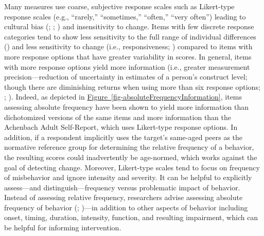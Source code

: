 \documentclass[
  american,
  letterpaper,
  12pt]{article}
\newlength{\apatablekeepdepth}
\newcommand{\apatablekeep}{%
  \par\setlength{\apatablekeepdepth}{\prevdepth}%
  \setbox\apatablekeepbox\vbox\bgroup\prevdepth\apatablekeepdepth}
\begin{document}
Many measures use coarse, subjective response scales such as Likert-type
response scales (e.g., ``rarely,'' ``sometimes,'' ``often,'' ``very
often'') leading to cultural bias (; ;
) and insensitivity to change.
Items with few discrete response categories tend to show less
sensitivity to the full range of individual differences
() and less
sensitivity to change (i.e., responsiveness;
) compared to items with
more response options that have greater variability in scores. In
general, items with more response options yield more information (i.e.,
greater measurement precision---reduction of uncertainty in estimates of
a person's construct level; though there are diminishing returns when
using more than six response options;
;
). Indeed, as depicted in
\hyperref[fig-absoluteFrequencyInformation]{Figure~\ref*{fig-absoluteFrequencyInformation}},
items assessing absolute frequency have been shown to yield more
information than dichotomized versions of the same items and more
information than the Achenbach Adult Self-Report, which uses Likert-type
response options. In addition, if a respondent implicitly uses the
target's same-aged peers as the normative reference group for
determining the relative frequency of a behavior, the resulting scores
could inadvertently be age-normed, which works against the goal of
detecting change. Moreover, Likert-type scales tend to focus on
frequency of misbehavior and ignore intensity and severity. It can be
helpful to explicitly assess---and distinguish---frequency versus
problematic impact of behavior. Instead of assessing relative frequency,
researchers advise assessing absolute frequency of behavior
(;
)---in addition to other
aspects of behavior including onset, timing, duration, intensity,
function, and resulting impairment, which can be helpful for informing
intervention.

\par\addvspace{\baselineskip}\begingroup

\setlength{\parindent}{0pt}

\captionsetup{type=figure}

\apatablekeep

\setcounter{figure}{6}
\end{document}
